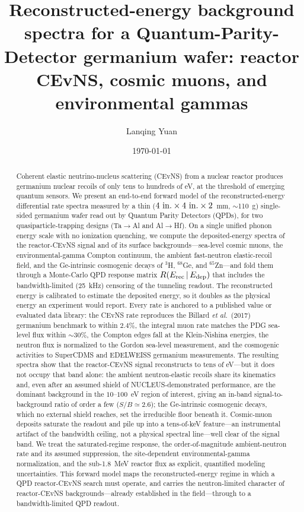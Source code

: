 \documentclass[aps,prd,twocolumn,superscriptaddress,nofootinbib]{revtex4-2}
\begin{document}
\title{Reconstructed-energy background spectra for a Quantum-Parity-Detector germanium wafer: reactor CEvNS, cosmic muons, and environmental gammas}

\author{Lanqing Yuan}
\date{\today}

\begin{abstract}
Coherent elastic neutrino-nucleus scattering (CEvNS) from a nuclear reactor produces germanium nuclear recoils of only tens to hundreds of eV, at the threshold of emerging quantum sensors. We present an end-to-end forward model of the reconstructed-energy differential rate spectra measured by a thin ($4~{\rm in.}\times4~{\rm in.}\times2$~mm, $\sim$110~g) single-sided germanium wafer read out by Quantum Parity Detectors (QPDs), for two quasiparticle-trapping designs (Ta$\to$Al and Al$\to$Hf). On a single unified phonon energy scale with no ionization quenching, we compute the deposited-energy spectra of the reactor-CEvNS signal and of its surface backgrounds---sea-level cosmic muons, the environmental-gamma Compton continuum, the ambient fast-neutron elastic-recoil field, and the Ge-intrinsic cosmogenic decays of $^{3}$H, $^{68}$Ge, and $^{65}$Zn---and fold them through a Monte-Carlo QPD response matrix $R(E_{\rm rec}\,|\,E_{\rm dep})$ that includes the bandwidth-limited (25~kHz) censoring of the tunneling readout. The reconstructed energy is calibrated to estimate the deposited energy, so it doubles as the physical energy an experiment would report. Every rate is anchored to a published value or evaluated data library: the CEvNS rate reproduces the Billard \emph{et al.}\ (2017) germanium benchmark to within $2.4\%$, the integral muon rate matches the PDG sea-level flux within $\sim$$30\%$, the Compton edges fall at the Klein-Nishina energies, the neutron flux is normalized to the Gordon sea-level measurement, and the cosmogenic activities to SuperCDMS and EDELWEISS germanium measurements. The resulting spectra show that the reactor-CEvNS signal reconstructs to tens of eV---but it does not occupy that band alone: the ambient neutron-elastic recoils share its kinematics and, even after an assumed shield of NUCLEUS-demonstrated performance, are the dominant background in the $10$--$100$~eV region of interest, giving an in-band signal-to-background ratio of order a few ($S/B\simeq2.6$); the Ge-intrinsic cosmogenic decays, which no external shield reaches, set the irreducible floor beneath it. Cosmic-muon deposits saturate the readout and pile up into a tens-of-keV feature---an instrumental artifact of the bandwidth ceiling, not a physical spectral line---well clear of the signal band. We treat the saturated-regime response, the order-of-magnitude ambient-neutron rate and its assumed suppression, the site-dependent environmental-gamma normalization, and the sub-1.8~MeV reactor flux as explicit, quantified modeling uncertainties. This forward model maps the reconstructed-energy regime in which a QPD reactor-CEvNS search must operate, and carries the neutron-limited character of reactor-CEvNS backgrounds---already established in the field---through to a bandwidth-limited QPD readout.
\end{abstract}
\end{document}
